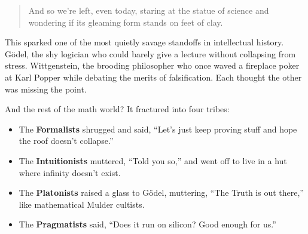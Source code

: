 \begin{quote}
And so we’re left, even today, staring at the statue of science and wondering if its gleaming form stands on feet of clay.
\end{quote}


This sparked one of the most quietly savage standoffs in intellectual history. Gödel, the shy logician who could barely give a lecture without collapsing from stress. Wittgenstein, the brooding philosopher who once waved a fireplace poker at Karl Popper while debating the merits of falsification. Each thought the other was missing the point. 

And the rest of the math world? It fractured into four tribes:

\begin{itemize}
    \item The \textbf{Formalists} shrugged and said, “Let’s just keep proving stuff and hope the roof doesn’t collapse.”
    \item The \textbf{Intuitionists} muttered, “Told you so,” and went off to live in a hut where infinity doesn’t exist.
    \item The \textbf{Platonists} raised a glass to Gödel, muttering, “The Truth is out there,” like mathematical Mulder cultists.
    \item The \textbf{Pragmatists} said, “Does it run on silicon? Good enough for us.”
\end{itemize}


\vspace{1em}

